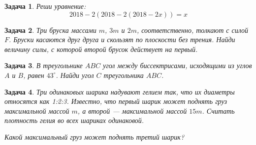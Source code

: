 \documentclass[a4paper, 12pt]{article}
\theoremstyle{break}
\newtheorem{problem}{Задача}[subsection]
\begin{document}
\begin{problem}
Реши уравнение:
\[
2018 − 2(2018 − 2(2018 − 2x)) = x
\]
\end{problem}

\begin{problem}
Три бруска массами $m$, $3m$ и $2m$, соответственно, толкают с силой $F$.
Бруски касаются друг друга и скользят по плоскости без трения.
Найди величину силы, с которой второй брусок действует на первый.

\begin{minipage}{0.8\textwidth}
\begin{center}
\end{center}
\end{minipage}
\end{problem}


\begin{problem}
В треугольнике $ABC$ угол между биссектрисами, исходящими из углов $A$ и $B$,
равен $43^{\circ}$. Найди угол $C$ треугольника $ABC$.
\end{problem}


\begin{problem}
Три одинаковых шарика надувают гелием так, что их диаметры относятся как 1:2:3.
Известно, что первый шарик может поднять груз максимальной массой $m$,
а второй — максимальной массой $15m$. Считать плотность гелия во всех шариках одинаковой.

Какой максимальный груз может поднять третий шарик?
\end{problem}
\end{document}
